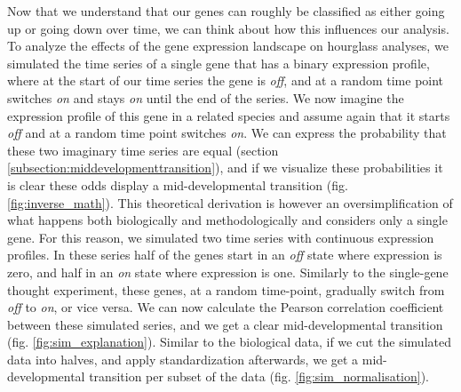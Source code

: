 Now that we understand that our genes can roughly be classified as either going up or going down over time, we can think about how this influences our analysis. To analyze the effects of the gene expression landscape on hourglass analyses, we simulated the time series of a single gene that has a binary expression profile, where at the start of our time series the gene is \textit{off}, and at a random time point switches \textit{on} and stays \textit{on} until the end of the series. We now imagine the expression profile of this gene in a related species and assume again that it starts \textit{off} and at a random time point switches \textit{on}. We can express the probability that these two imaginary time series are equal (section \ref{subsection:middevelopmenttransition}), and if we visualize these probabilities it is clear these odds display a mid-developmental transition (fig. \ref{fig:inverse_math}). This theoretical derivation is however an oversimplification of what happens both biologically and methodologically and considers only a single gene. For this reason, we simulated two time series with continuous expression profiles. In these series half of the genes start in an \textit{off} state where expression is zero, and half in an \textit{on} state where expression is one. Similarly to the single-gene thought experiment, these genes, at a random time-point, gradually switch from \textit{off} to \textit{on}, or vice versa. We can now calculate the Pearson correlation coefficient between these simulated series, and we get a clear mid-developmental transition (fig. \ref{fig:sim_explanation}). Similar to the biological data, if we cut the simulated data into halves, and apply standardization afterwards, we get a mid-developmental transition per subset of the data (fig. \ref{fig:sim_normalisation}). 

